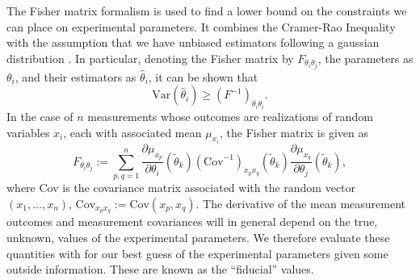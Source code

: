 \documentclass[11pt]{article} %
\newcommand{\br}[1]{\ensuremath{\left( #1 \right)}}
\begin{document}
The Fisher matrix formalism is used to find a lower bound on the constraints we can place on experimental parameters. It combines the Cramer-Rao Inequality \cite{casella2002statistical} with the assumption that we have unbiased estimators  following a gaussian distribution \cite{dodelson2020modern}. In particular, denoting the Fisher matrix by $F_{\theta_i\theta_j}$, the parameters as $\theta_i$, and their estimators as $\hat\theta_i$, it can be shown that
\begin{equation}
    \text{Var}(\hat\theta_i) \geq \br{F^{-1}}_{\theta_i\theta_i}.
\end{equation}
In the case of $n$ measurements whose outcomes are realizations of random variables $x_i$, each with associated mean $\mu_{x_i}$, the Fisher matrix is given as
\begin{equation}
    F_{\theta_i\theta_j} := \sum_{p, q=1}^n \frac{\partial\mu_{x_p}}{\partial\theta_i}(\tilde\theta_k)(\text{Cov}^{-1})_{x_px_q}(\tilde \theta_k)\frac{\partial\mu_{x_q}}{\partial\theta_j}(\tilde\theta_k),
\end{equation}
where Cov is the covariance matrix associated with the random vector $(x_1, ..., x_n)$, $\text{Cov}_{x_px_q}:=\text{Cov}(x_p,x_q)$. The derivative of the mean measurement outcomes and measurement covariances will in general depend on the true, unknown, values of the experimental parameters. We therefore evaluate these quantities with for our best guess of the experimental parameters given some outside information. These are known as the ``fiducial'' values.


\end{document}
